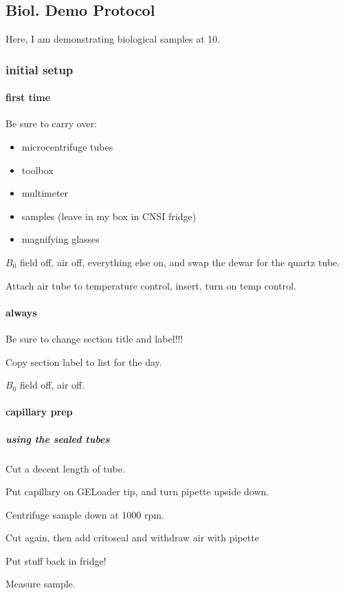 \subsection{Biol. Demo Protocol}\label{sec:biol_}
\timeblockstart
{}
Here, I am demonstrating biological samples at 10\uM.

\subsubsection{initial setup}
\paragraph{first time}
Be sure to carry over:
\begin{itemize}
    \item microcentrifuge tubes
    \item toolbox 
    \item multimeter 
    \item samples (leave in my box in CNSI fridge)
    \item magnifying glasses
\end{itemize}

$B_0$ field off, air off, everything else on, and swap the dewar for the quartz tube.

Attach air tube to temperature control, insert, turn on temp control.

\paragraph{always}
Be sure to change section title and label!!!

Copy section label to list for the day.

$B_0$ field off, air off.

\paragraph{capillary prep}
\subparagraph{using the sealed tubes}

Cut a decent length of tube.

Put capillary on GELoader tip, and turn pipette upside down.

Centrifuge sample down at 1000 rpm.

Cut again, then add critoseal and withdraw air with pipette

Put stuff back in fridge!

Measure sample.

